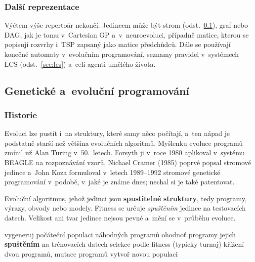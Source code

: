 \documentclass[11pt,a4paper]{article}
\theoremstyle{definition}
\begin{document}
\subsubsection{Další reprezentace}

Výčtem výše repertoár nekončí. Jedincem může být strom (odst.~\ref{sec:gp}), graf nebo
DAG, jak je tomu v~Cartesian GP a~v~neuroevoluci, případně matice, kterou se popisují
rozvrhy i~TSP zapsaný jako matice předchůdců. Dále se používají konečné automaty
v~evolučním programování, seznamy pravidel v~systémech LCS (odst.~\ref{sec:lcs})
a~celí agenti umělého života.

\subsection{Genetické a~evoluční programování}
\label{sec:gp}

\subsubsection{Historie}

Evoluci lze pustit i~na struktury, které samy něco počítají, a~ten nápad je podstatně
starší než většina evolučních algoritmů.
Myšlenku evoluce programů zmínil už Alan Turing v~50.\ letech. Forsyth ji v~roce 1980
aplikoval v~systému BEAGLE na rozpoznávání vzorů, Nichael Cramer (1985) poprvé popsal
stromové jedince a~John Koza formuloval v~letech 1989--1992 stromové genetické
programování v~podobě, v~jaké je známe dnes; nechal si je také patentovat.

\begin{defbox}
Evoluční algoritmus, jehož jedinci jsou \textbf{spustitelné struktury}, tedy programy,
výrazy, obvody nebo modely. Fitness se určuje \emph{spuštěním} jedince na testovacích
datech. Velikost ani tvar jedince nejsou pevné a~mění se v~průběhu evoluce.
\end{defbox}

\begin{algorithm}[!ht]
\caption{Obecné schéma GP}
\begin{algorithmic}[1]
\State vygeneruj počáteční populaci náhodných programů
  \State ohodnoť programy jejich \textbf{spuštěním} na trénovacích datech
  \State selekce podle fitness (typicky turnaj)
  \State křížení dvou programů, mutace programů
  \State vytvoř novou populaci
\EndWhile
\end{algorithmic}
\end{algorithm}
\end{document}
